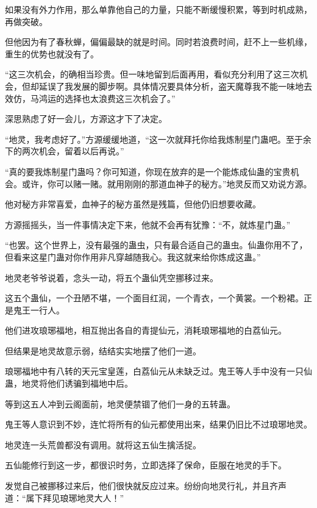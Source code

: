 
\begin{this_body}



如果没有外力作用，那么单靠他自己的力量，只能不断缓慢积累，等到时机成熟，再做突破。

但他因为有了春秋蝉，偏偏最缺的就是时间。同时若浪费时间，赶不上一些机缘，重生的优势也就没有了。

“这三次机会，的确相当珍贵。但一味地留到后面再用，看似充分利用了这三次机会，但却延误了我发展的脚步啊。具体情况要具体分析，盗天魔尊我不能一味地去效仿，马鸿运的选择也太浪费这三次机会了。”

深思熟虑了好一会儿，方源这才下了决定。

“地灵，我考虑好了。”方源缓缓地道，“这一次就拜托你给我炼制星门蛊吧。至于余下的两次机会，留着以后再说。”

“真的要我炼制星门蛊吗？你可知道，你现在放弃的是一个能炼成仙蛊的宝贵机会。或许，你可以赌一赌。就用刚刚的那道血神子的秘方。”地灵反而又劝说方源。

他对秘方非常喜爱，血神子的秘方虽然是残篇，但他仍旧想要收藏。

方源摇摇头，当一件事情决定下来，他就不会再有犹豫：“不，就炼星门蛊。”

“也罢。这个世界上，没有最强的蛊虫，只有最合适自己的蛊虫。仙蛊你用不了，但看来这星门蛊对你作用非凡穿越随我心。我这就来给你炼成这蛊。”

地灵老爷爷说着，念头一动，将五个蛊仙凭空挪移过来。

这五个蛊仙，一个丑陋不堪，一个面目红润，一个青衣，一个黄裳。一个粉裙。正是鬼王一行人。

他们进攻琅琊福地，相互抛出各自的青提仙元，消耗琅琊福地的白荔仙元。

但结果是地灵故意示弱，结结实实地摆了他们一道。

琅琊福地中有八转的天元宝皇莲，白荔仙元从未缺乏过。鬼王等人手中没有一只仙蛊，地灵将他们诱骗到福地中后。

等到这五人冲到云阁面前，地灵便禁锢了他们一身的五转蛊。

鬼王等人意识到不妙，连忙将所有的仙元都使用出来，结果仍旧比不过琅琊地灵。

地灵连一头荒兽都没有调用。就将这五仙生擒活捉。

五仙能修行到这一步，都很识时务，立即选择了保命，臣服在地灵的手下。

发觉自己被挪移过来后，他们很快就反应过来。纷纷向地灵行礼，并且齐声道：“属下拜见琅琊地灵大人！”


\end{this_body}
